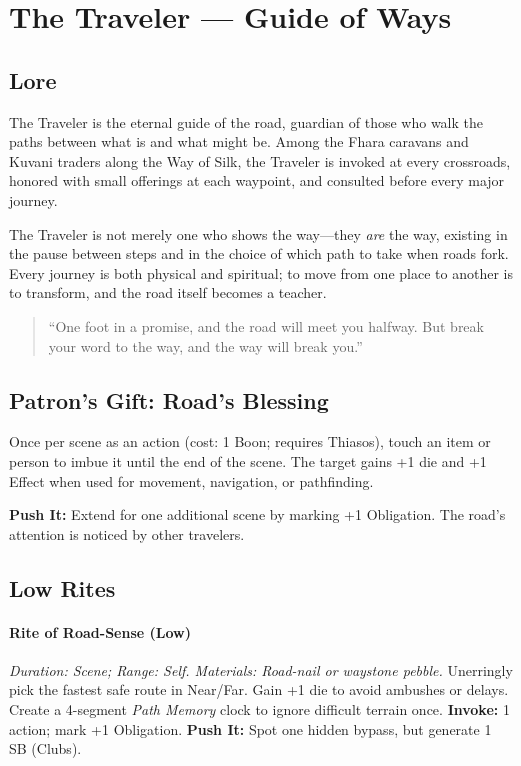 \section{The Traveler --- Guide of Ways}
\label{patron:traveler}

\subsection*{Lore}
%
The Traveler is the eternal guide of the road, guardian of those who walk the paths between what is and what might be. Among the Fhara caravans and Kuvani traders along the Way of Silk, the Traveler is invoked at every crossroads, honored with small offerings at each waypoint, and consulted before every major journey.  

The Traveler is not merely one who shows the way---they \emph{are} the way, existing in the pause between steps and in the choice of which path to take when roads fork. Every journey is both physical and spiritual; to move from one place to another is to transform, and the road itself becomes a teacher.  

\begin{quote}
``One foot in a promise, and the road will meet you halfway. But break your word to the way, and the way will break you.''
\end{quote}

\subsection*{Patron's Gift: Road's Blessing}
Once per scene as an action (cost: 1 Boon; requires Thiasos), touch an item or person to imbue it until the end of the scene. The target gains +1 die and +1 Effect when used for movement, navigation, or pathfinding.  

\textbf{Push It:} Extend for one additional scene by marking +1 Obligation. The road’s attention is noticed by other travelers.

\subsection*{Low Rites}
\paragraph{Rite of Road-Sense (Low)}  
\emph{Duration: Scene; Range: Self. Materials: Road-nail or waystone pebble.}  
Unerringly pick the fastest safe route in Near/Far. Gain +1 die to avoid ambushes or delays. Create a 4-segment \emph{Path Memory} clock to ignore difficult terrain once.  
\textbf{Invoke:} 1 action; mark +1 Obligation.  
\textbf{Push It:} Spot one hidden bypass, but generate 1 SB (Clubs).

